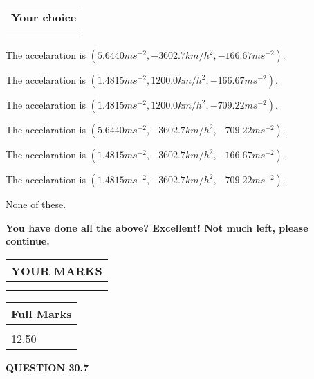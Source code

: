 \documentclass[12pt]{article}
\begin{document}
  
  
\noindent\hspace{3.0in} \begin{tabular}{|l|}
\hline
Your choice \\
\hline
 \\ 
 \\ 
\hline
\end{tabular}
  
  
 
 
The accelaration is
$(
5.6440ms^{-2},
-3602.7km/h^2,
-166.67ms^{-2}
).
$
 
 
The accelaration is
$(
1.4815ms^{-2},
1200.0km/h^2,
-166.67ms^{-2}
).
$
 
 
The accelaration is
$(
1.4815ms^{-2},
1200.0km/h^2,
-709.22ms^{-2}
).
$
 
 
The accelaration is
$(
5.6440ms^{-2},
-3602.7km/h^2,
-709.22ms^{-2}
).
$
 
 
The accelaration is
$(
1.4815ms^{-2},
-3602.7km/h^2,
-166.67ms^{-2}
).
$
 
 
The accelaration is
$(
1.4815ms^{-2},
-3602.7km/h^2,
-709.22ms^{-2}
).
$
 
 
 None of these.
 
 
 
 

 
\vspace{0.3in}
   
   
\vspace{0.3in}
{\textbf{\LARGE{You have done all the above? Excellent! Not much left, please continue.}}}
\vspace{0.3in}
   
   
  
\vspace{0.2in}
  
\noindent\begin{tabular}{|l|}
\hline
 YOUR MARKS  \\
\hline
 \\ 
 \\ 
\hline
\end{tabular}
\hspace{0.05in} \begin{tabular}{|l|}
\hline
 Full Marks  \\
\hline
 \\ 
12.50 \\
\hline
\end{tabular}
{\textbf{\Large{QUESTION
30.7 
}}}
  
\end{document}
